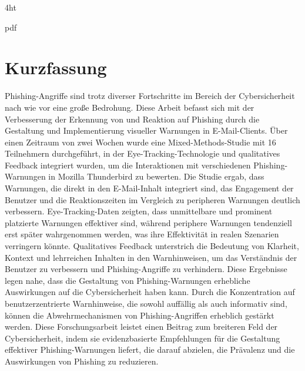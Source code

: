 \documentclass[
  a4paper,  %
  twoside,  %
  bibliography=totoc,
  headsepline,
  cleardoublepage=empty,
  parskip=half,
  draft=false
]{scrbook}
\begin{document}
\iftex4ht
  \Configure{}{\PicMath}{\EndPicMath}{}

  {pdf}
  {%
  }
\fi



\Coverpage
\Copyright
\pagestyle{preamble}
\renewcommand*{\chapterpagestyle}{preamble}



\section*{Kurzfassung}
Phishing-Angriffe sind trotz diverser Fortschritte im Bereich der Cybersicherheit nach wie vor eine große Bedrohung. Diese Arbeit befasst sich mit der Verbesserung der Erkennung von und Reaktion auf Phishing durch die Gestaltung und Implementierung visueller Warnungen in E-Mail-Clients. Über einen Zeitraum von zwei Wochen wurde eine Mixed-Methods-Studie mit 16 Teilnehmern durchgeführt, in der Eye-Tracking-Technologie und qualitatives Feedback integriert wurden, um die Interaktionen mit verschiedenen Phishing-Warnungen in Mozilla Thunderbird zu bewerten. \newline
Die Studie ergab, dass Warnungen, die direkt in den E-Mail-Inhalt integriert sind, das Engagement der Benutzer und die Reaktionszeiten im Vergleich zu peripheren Warnungen deutlich verbessern. Eye-Tracking-Daten zeigten, dass unmittelbare und prominent platzierte Warnungen effektiver sind, während periphere Warnungen tendenziell erst später wahrgenommen werden, was ihre Effektivität in realen Szenarien verringern könnte. Qualitatives Feedback unterstrich die Bedeutung von Klarheit, Kontext und lehrreichen Inhalten in den Warnhinweisen, um das Verständnis der Benutzer zu verbessern und Phishing-Angriffe zu verhindern. \newline
Diese Ergebnisse legen nahe, dass die Gestaltung von Phishing-Warnungen erhebliche Auswirkungen auf die Cybersicherheit haben kann. Durch die Konzentration auf benutzerzentrierte Warnhinweise, die sowohl auffällig als auch informativ sind, können die Abwehrmechanismen von Phishing-Angriffen erheblich gestärkt werden. Diese Forschungsarbeit leistet einen Beitrag zum breiteren Feld der Cybersicherheit, indem sie evidenzbasierte Empfehlungen für die Gestaltung effektiver Phishing-Warnungen liefert, die darauf abzielen, die Prävalenz und die Auswirkungen von Phishing zu reduzieren. 
\end{document}
